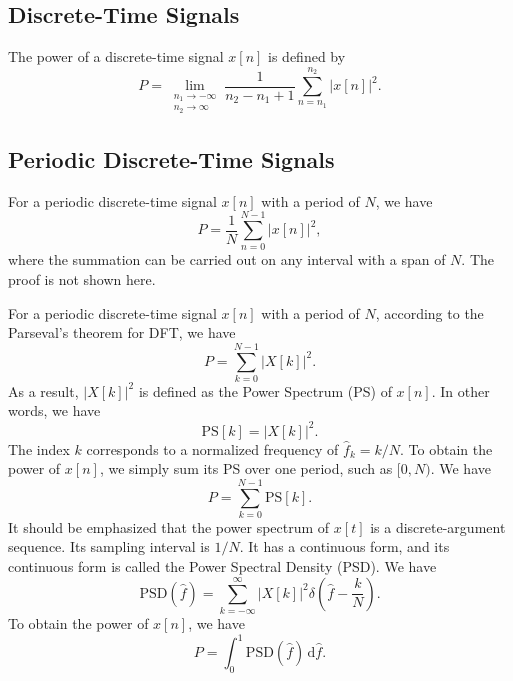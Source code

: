 \documentclass[journal,twoside]{IEEEtran}
\newcommand{\dd}{\,\mathrm{d}}
\begin{document}
\subsection{Discrete-Time Signals}

The power of a discrete-time signal $x[n]$ is defined by
\begin{equation}
P = \lim_{\substack{n_1\rightarrow -\infty\\n_2\rightarrow \infty}}\frac{1}{n_2-n_1+1}\sum_{n=n_1}^{n_2}|x[n]|^2.
\end{equation}

\subsection{Periodic Discrete-Time Signals}

For a periodic discrete-time signal $x[n]$ with a period of $N$, we have
\begin{equation}
P = \frac{1}{N}\sum_{n=0}^{N-1}|x[n]|^2,
\end{equation}
where the summation can be carried out on any interval with a span of $N$. The proof is not shown here.

For a periodic discrete-time signal $x[n]$ with a period of $N$, according to the Parseval's theorem for DFT, we have
\begin{equation}
P = \sum_{k=0}^{N-1}|X[k]|^2.
\end{equation}
As a result, $|X[k]|^2$ is defined as the Power Spectrum (PS) of $x[n]$. In other words, we have
\begin{equation}
\mathrm{PS}[k] = |X[k]|^2.
\end{equation}
The index $k$ corresponds to a normalized frequency of $\hat{f}_{k} = k/N$. To obtain the power of $x[n]$, we simply sum its PS over one period, such as $[0, N)$. We have
\begin{equation}
P = \sum_{k=0}^{N-1} \mathrm{PS}[k].
\end{equation}
It should be emphasized that the power spectrum of $x[t]$ is a discrete-argument sequence. Its sampling interval is $1/N$. It has a continuous form, and its continuous form is called the Power Spectral Density (PSD). We have
\begin{equation}
\mathrm{PSD}(\hat{f}) = \sum_{k=-\infty}^{\infty} |X[k]|^2 \delta \left( \hat{f} - \frac{k}{N} \right).\label{eqn:PSD_hatf_def}
\end{equation}
To obtain the power of $x[n]$, we have
\begin{equation}
P = \int_{0}^{1} \mathrm{PSD}(\hat{f}) \dd \hat{f}.\label{eqn:PSD_hatf_to_P}
\end{equation}
\end{document}
